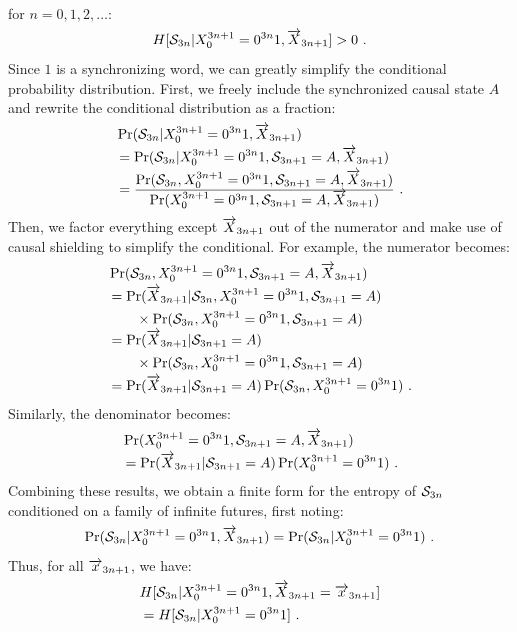 for $n = 0,1,2,\ldots$:
\begin{align*}
H[\mathcal{S}_{3n} | {X}_0^{3n+1} = 0^{3n}1, \smash{\overrightarrow{{X}}}_{3n+1}] > 0 ~.
\end{align*}
Since $1$ is a synchronizing word, we can greatly simplify the conditional
probability distribution.  First, we freely include the synchronized causal 
state $A$ and rewrite the conditional distribution as a fraction:
\begin{align*}
& \Pr(\mathcal{S}_{3n} | {X}_0^{3n+1} = 0^{3n}1, \smash{\overrightarrow{{X}}}_{3n+1})\\
&= \Pr(\mathcal{S}_{3n} | {X}_0^{3n+1} = 0^{3n}1, \mathcal{S}_{3n+1}=A, \smash{\overrightarrow{{X}}}_{3n+1})\\
&= \frac{\Pr(\mathcal{S}_{3n}, {X}_0^{3n+1} = 0^{3n}1, \mathcal{S}_{3n+1}=A, \smash{\overrightarrow{{X}}}_{3n+1})}
        {\Pr({X}_0^{3n+1} = 0^{3n}1, \mathcal{S}_{3n+1}=A, \smash{\overrightarrow{{X}}}_{3n+1})} ~.
\end{align*}
Then, we factor everything except $\smash{\overrightarrow{{X}}}_{3n+1}$ out of the numerator 
and make use of causal shielding to simplify the conditional. For example,
the numerator becomes:
\begin{align*}
& \Pr(\mathcal{S}_{3n}, {X}_0^{3n+1} = 0^{3n}1, \mathcal{S}_{3n+1}=A, \smash{\overrightarrow{{X}}}_{3n+1})\\
&= \Pr(\smash{\overrightarrow{{X}}}_{3n+1}|\mathcal{S}_{3n}, {X}_0^{3n+1} = 0^{3n}1, \mathcal{S}_{3n+1}=A) \\
&\qquad \times \Pr(\mathcal{S}_{3n}, {X}_0^{3n+1} = 0^{3n}1, \mathcal{S}_{3n+1}=A)\\
&= \Pr(\smash{\overrightarrow{{X}}}_{3n+1}|\mathcal{S}_{3n+1}=A) \\
&\qquad \times 
\Pr(\mathcal{S}_{3n}, {X}_0^{3n+1} = 0^{3n}1, \mathcal{S}_{3n+1}=A)\\
&= \Pr(\smash{\overrightarrow{{X}}}_{3n+1}|\mathcal{S}_{3n+1}=A) \Pr(\mathcal{S}_{3n}, {X}_0^{3n+1} = 0^{3n}1)~ .
\end{align*}
Similarly, the denominator becomes:
\begin{align*}
& \Pr({X}_0^{3n+1} = 0^{3n}1, \mathcal{S}_{3n+1}=A, \smash{\overrightarrow{{X}}}_{3n+1})\\
&= \Pr(\smash{\overrightarrow{{X}}}_{3n+1}|\mathcal{S}_{3n+1}=A) \Pr({X}_0^{3n+1} = 0^{3n}1)~ .
\end{align*}
Combining these results, we obtain a finite form for the entropy of
$\mathcal{S}_{3n}$ conditioned on a family of infinite futures, first noting:
\begin{align*}
\Pr(\mathcal{S}_{3n} | {X}_0^{3n+1} = 0^{3n}1, \smash{\overrightarrow{{X}}}_{3n+1}) 
    = \Pr(\mathcal{S}_{3n} | {X}_0^{3n+1} = 0^{3n}1) ~.
\end{align*}
Thus, for all $\smash{\overrightarrow{{x}}}_{3n+1}$, we have:
\begin{align*}
& H[\mathcal{S}_{3n} | {X}_0^{3n+1} = 0^{3n}1, 
                        \smash{\overrightarrow{{X}}}_{3n+1}=\smash{\overrightarrow{{x}}}_{3n+1}] \\
&= H[\mathcal{S}_{3n} | {X}_0^{3n+1} = 0^{3n}1] ~.
\end{align*}

